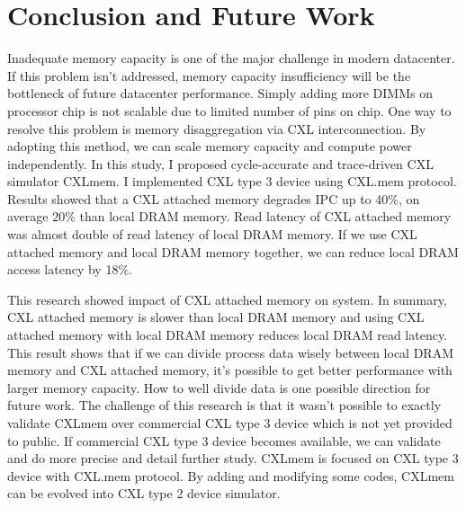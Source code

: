 \chapter{Conclusion and Future Work} \label{sec:conclusion}

Inadequate memory capacity is one of the major challenge in modern datacenter. If this problem isn't addressed, memory capacity insufficiency will be the bottleneck of future datacenter performance. Simply adding more DIMMs on processor chip is not scalable due to limited number of pins on chip. One way to resolve this problem is memory disaggregation via CXL interconnection. By adopting this method, we can scale memory capacity and compute power independently. In this study, I proposed cycle-accurate and trace-driven CXL simulator CXLmem. I implemented CXL type 3 device using CXL.mem protocol. Results showed that a CXL attached memory degrades IPC up to 40\%, on average 20\% than local DRAM memory. Read latency of CXL attached memory was almost double of read latency of local DRAM memory. If we use CXL attached memory and local DRAM memory together, we can reduce local DRAM access latency by 18\%.

This research showed impact of CXL attached memory on system. In summary, CXL attached memory is slower than local DRAM memory and using CXL attached memory with local DRAM memory reduces local DRAM read latency. This result shows that if we can divide process data wisely between local DRAM memory and CXL attached memory, it's possible to get better performance with larger memory capacity. How to well divide data is one possible direction for future work. The challenge of this research is that it wasn't possible to exactly validate CXLmem over commercial CXL type 3 device which is not yet provided to public. If commercial CXL type 3 device becomes available, we can validate and do more precise and detail further study. CXLmem is focused on CXL type 3 device with CXL.mem protocol. By adding and modifying some codes, CXLmem can be evolved into CXL type 2 device simulator. 